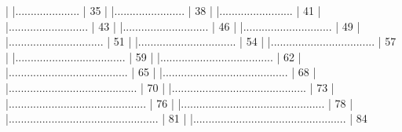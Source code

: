 \documentclass[a4paper,12pt]{article}\usepackage[]{graphicx}\usepackage[]{color}
\begin{document}
\begin{Schunk}
\begin{Soutput}
  |                                                                  
  |.....................                                       |  35%
  |                                                                  
  |.......................                                     |  38%
  |                                                                  
  |........................                                    |  41%
  |                                                                  
  |..........................                                  |  43%
  |                                                                  
  |............................                                |  46%
  |                                                                  
  |.............................                               |  49%
  |                                                                  
  |...............................                             |  51%
  |                                                                  
  |................................                            |  54%
  |                                                                  
  |..................................                          |  57%
  |                                                                  
  |....................................                        |  59%
  |                                                                  
  |.....................................                       |  62%
  |                                                                  
  |.......................................                     |  65%
  |                                                                  
  |.........................................                   |  68%
  |                                                                  
  |..........................................                  |  70%
  |                                                                  
  |............................................                |  73%
  |                                                                  
  |.............................................               |  76%
  |                                                                  
  |...............................................             |  78%
  |                                                                  
  |.................................................           |  81%
  |                                                                  
  |..................................................          |  84%

\end{Soutput}
\end{Schunk}
\end{document}
